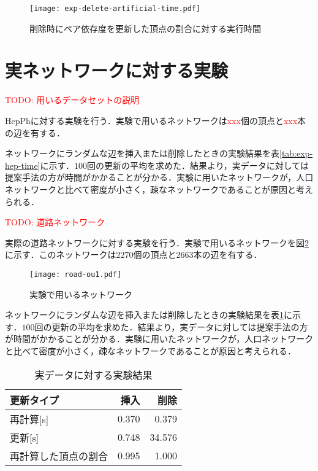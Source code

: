 \begin{figure}[tb]
  \centering
  \texttt{[image: exp-delete-artificial-time.pdf]}
  \caption{削除時にペア依存度を更新した頂点の割合に対する実行時間}
  \label{fig:exp-delete-artificial-recalc}
\end{figure}

\section{実ネットワークに対する実験}

\textcolor{red}{TODO: 用いるデータセットの説明}

HepPhに対する実験を行う．実験で用いるネットワークは\textcolor{red}{xxx}個の頂点と\textcolor{red}{xxx}本の辺を有する．

ネットワークにランダムな辺を挿入または削除したときの実験結果を表\ref{tab:exp-hep-time}に示す．$100$回の更新の平均を求めた．結果より，実データに対しては提案手法の方が時間がかかることが分かる．実験に用いたネットワークが，人口ネットワークと比べて密度が小さく，疎なネットワークであることが原因と考えられる．



\textcolor{red}{TODO: 道路ネットワーク}

実際の道路ネットワークに対する実験を行う．実験で用いるネットワークを図\ref{fig:net-ou1}に示す．このネットワークは2270個の頂点と2663本の辺を有する．
\begin{figure}[tb]
  \centering
  \texttt{[image: road-ou1.pdf]}
  \caption{実験で用いるネットワーク}
  \label{fig:net-ou1}
\end{figure}

ネットワークにランダムな辺を挿入または削除したときの実験結果を表\ref{tab:res-ou1}に示す．$100$回の更新の平均を求めた．結果より，実データに対しては提案手法の方が時間がかかることが分かる．実験に用いたネットワークが，人口ネットワークと比べて密度が小さく，疎なネットワークであることが原因と考えられる．

\begin{table}[tb]
  \centering
  \caption{実データに対する実験結果}
  \label{tab:res-ou1}
  \begin{tabular}{lrr}
    \hline\hline
    更新タイプ & 挿入 & 削除 \\ \hline\hline
    再計算[s] & 0.370 & 0.379 \\ \hline
    更新[s] & 0.748 & 34.576 \\ \hline\hline
    再計算した頂点の割合 & 0.995 & 1.000 \\ \hline\hline
  \end{tabular}
\end{table}
